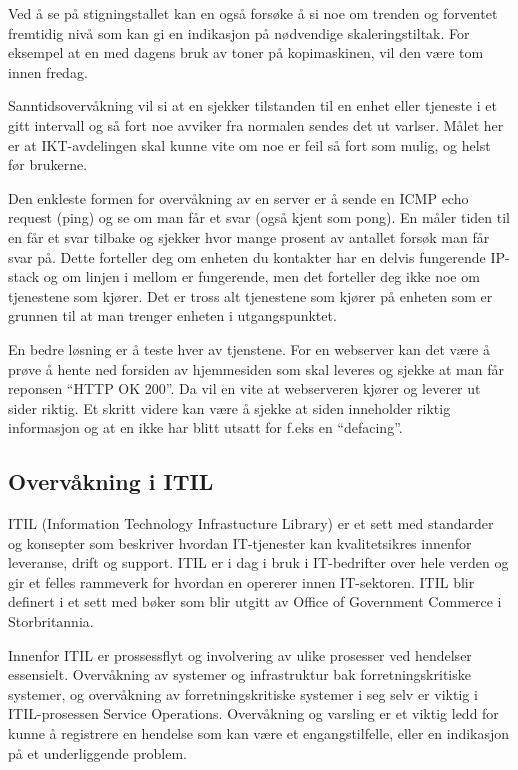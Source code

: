Ved å se på stigningstallet kan en også forsøke å si noe om trenden og forventet fremtidig nivå som kan gi en indikasjon på nødvendige skaleringstiltak. For eksempel at en med dagens bruk av toner på kopimaskinen, vil den være tom innen fredag. 

Sanntidsovervåkning vil si at en sjekker tilstanden til en enhet eller tjeneste i et gitt intervall og så fort noe avviker fra normalen sendes det ut varlser. Målet her er at IKT-avdelingen skal kunne vite om noe er feil så fort som mulig, og helst før brukerne.

Den enkleste formen for overvåkning av en server er å sende en ICMP echo request (ping) og se om man får et svar (også kjent som pong). En måler tiden til en får et svar tilbake og sjekker hvor mange prosent av antallet forsøk man får svar på. Dette forteller deg om enheten du kontakter har en delvis fungerende IP-stack og om linjen i mellom er fungerende, men det forteller deg ikke noe om tjenestene som kjører. Det er tross alt tjenestene som kjører på enheten som er grunnen til at man trenger enheten i utgangspunktet.

En bedre løsning er å teste hver av tjenstene. For en webserver kan det være å prøve å hente ned forsiden av hjemmesiden som skal leveres og sjekke at man får reponsen “HTTP OK 200”. Da vil en vite at webserveren kjører og leverer ut sider riktig. Et skritt videre kan være å sjekke at siden inneholder riktig informasjon og at en ikke har blitt utsatt for f.eks en “defacing”.

\subsection{Overvåkning i ITIL}
ITIL (Information Technology Infrastucture Library) er et sett med standarder og konsepter som beskriver hvordan IT-tjenester kan kvalitetsikres innenfor leveranse, drift og support. ITIL er i dag i bruk i IT-bedrifter over hele verden og gir et felles rammeverk for hvordan en opererer innen IT-sektoren. ITIL blir definert i et sett med bøker som blir utgitt av Office of Government Commerce i Storbritannia.

Innenfor ITIL er prossessflyt og involvering av ulike prosesser ved hendelser essensielt.  Overvåkning av systemer og infrastruktur bak forretningskritiske systemer, og overvåkning av forretningskritiske systemer i seg selv er viktig i ITIL-prosessen Service Operations. Overvåkning og varsling er et viktig ledd for kunne å registrere en hendelse som kan være et engangstilfelle, eller en indikasjon på et underliggende problem. 

